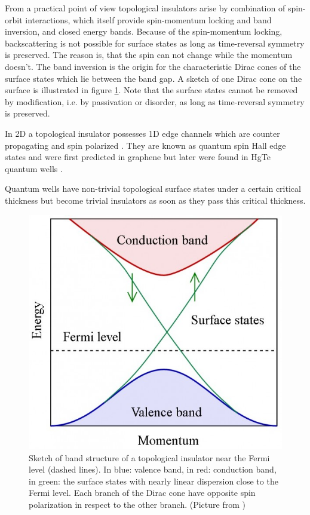 	From a practical point of view topological insulators arise by combination of spin-orbit interactions, which itself provide spin-momentum locking and band inversion, and closed energy bands. Because of the spin-momentum locking, backscattering is not possible for surface states as long as time-reversal symmetry is preserved. The reason is, that the spin can not change while the momentum doesn't. 
	The band inversion is the origin for the characteristic Dirac cones of the surface states which lie between the band gap.
	A sketch of one Dirac cone on the surface is illustrated in figure \ref{band_structure_top_insulator}.
	Note that the surface states cannot be removed by modification, i.e. by passivation or disorder, as long as time-reversal symmetry is preserved. 
	
	In 2D a topological insulator possesses 1D edge channels which are counter propagating and spin polarized \cite{Kane_Mele2}. They are known as quantum spin Hall edge states and were first predicted in graphene \cite{Kane_Mele2} but later were found in HgTe quantum wells \cite{Bernevig}. 
	
	Quantum wells have non-trivial topological surface states under a certain critical thickness but become trivial insulators as soon as they pass this critical thickness. 
	\begin{figure}[b!]
		\centering
		\includegraphics[width=0.4\linewidth]{andere_bilder/band_structure_top_insulator.jpg}
		\caption{%
			Sketch of band structure of a topological insulator near the Fermi level (dashed lines). In blue: valence band, in red: conduction band, in green: the surface states with nearly linear dispersion close to the Fermi level. Each branch of the Dirac cone have opposite spin polarization in respect to the other branch. 
			(Picture from \cite{wiki_top_ins})} \label{band_structure_top_insulator}
	\end{figure}
	
